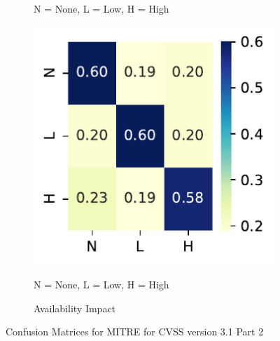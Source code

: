 \documentclass[12pt]{article}
\begin{document}
\begin{figure}
\begin{subfigure}[t]{0.45\textwidth}
		\begin{tablenotes}
			\footnotesize
			\item \quad N = None, L = Low, H = High
		\end{tablenotes}
	\end{subfigure}
	\hfill
	\begin{subfigure}[t]{0.45\textwidth}
		\includegraphics[width=\textwidth]{./figures/confusion_matrices/availability_impact_mitre.pdf}
		\caption{Availability Impact}

		\begin{tablenotes}
			\footnotesize
			\item \quad N = None, L = Low, H = High
		\end{tablenotes}
	\end{subfigure}

	\caption{\label{fig:mitre_31_confusion_matrices_2}Confusion Matrices for MITRE for CVSS version 3.1 Part 2}
\end{figure}
\end{document}
